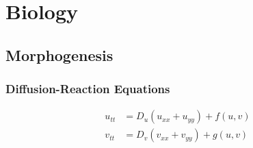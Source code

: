 \section{Biology}

\subsection{Morphogenesis}

\subsubsection{Diffusion-Reaction Equations}

\begin{eqnarray}
u_{tt} &= D_u (u_{xx} + u_{yy}) + f(u,v)  \\
v_{tt} &= D_v (v_{xx} + v_{yy}) + g(u,v) 
\end{eqnarray}





\begin{comment}

-Evolution
-Ecology (Predator-prey model)

\end{comment}